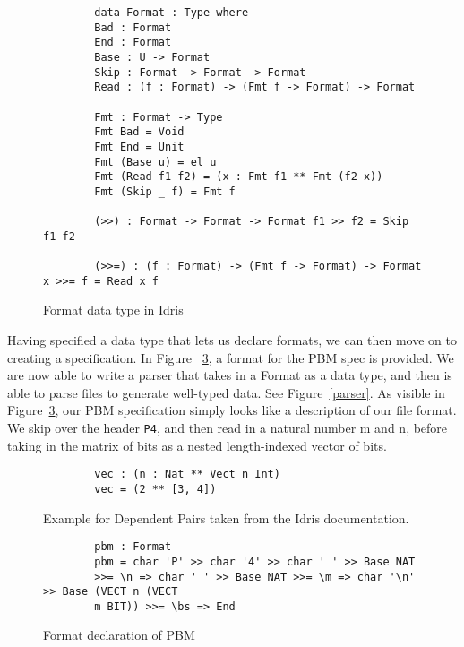 \begin{figure}[ht!!!!!!]
    \caption{Format data type in Idris \protect\cite{power_of_pi}}
    \label{formatDeclaration}
    \begin{lstlisting}
        data Format : Type where 
        Bad : Format 
        End : Format
        Base : U -> Format
        Skip : Format -> Format -> Format 
        Read : (f : Format) -> (Fmt f -> Format) -> Format

        Fmt : Format -> Type 
        Fmt Bad = Void 
        Fmt End = Unit 
        Fmt (Base u) = el u
        Fmt (Read f1 f2) = (x : Fmt f1 ** Fmt (f2 x)) 
        Fmt (Skip _ f) = Fmt f

        (>>) : Format -> Format -> Format f1 >> f2 = Skip f1 f2

        (>>=) : (f : Format) -> (Fmt f -> Format) -> Format x >>= f = Read x f
    \end{lstlisting}
\end{figure}

Having specified a data type that lets us declare formats, we can then move on
to creating a specification. In Figure ~\ref{spec_declaration}, a format for the
PBM spec is provided. We are now able to write a parser that takes in a Format
as a data type, and then is able to parse files to generate well-typed data. See
Figure~\ref{parser}. As visible in Figure~\ref{spec_declaration}, our PBM
specification simply looks like a description of our file format. We skip over
the header \texttt{P4}, and then read in a natural number m and n, before taking
in the matrix of bits as a nested length-indexed vector of bits. 

\begin{figure}[h]
    \caption{Example for Dependent Pairs taken from the Idris documentation.}
    \label{dependentPairExample}
    \begin{lstlisting}
        vec : (n : Nat ** Vect n Int)
        vec = (2 ** [3, 4])
    \end{lstlisting}
\end{figure}

\begin{figure}[h]
    \caption{Format declaration of PBM \protect\cite{power_of_pi}}
    \label{spec_declaration}
    \begin{lstlisting}
        pbm : Format 
        pbm = char 'P' >> char '4' >> char ' ' >> Base NAT
        >>= \n => char ' ' >> Base NAT >>= \m => char '\n' >> Base (VECT n (VECT
        m BIT)) >>= \bs => End
    \end{lstlisting}
\end{figure}


